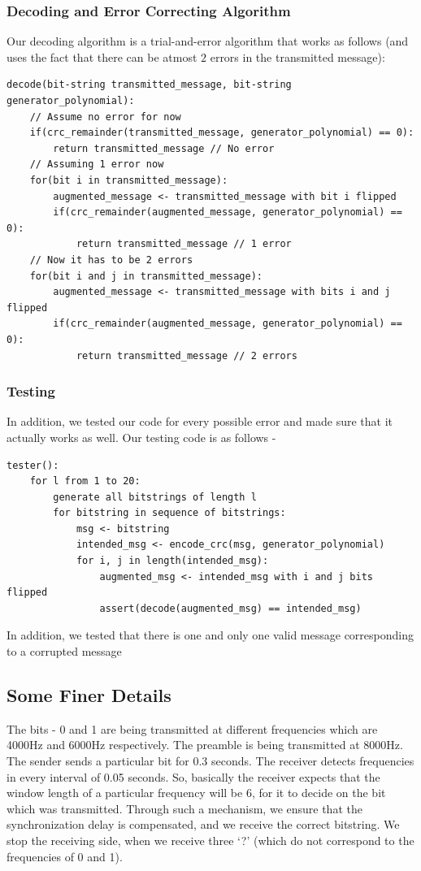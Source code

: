 \documentclass[a4paper,12pt]{article}
\begin{document}
\subsubsection{Decoding and Error Correcting Algorithm}
Our decoding algorithm is a trial-and-error algorithm that works as follows (and uses the fact that there can be atmost $2$ errors in the transmitted message):
\begin{verbatim}
decode(bit-string transmitted_message, bit-string generator_polynomial):
    // Assume no error for now
    if(crc_remainder(transmitted_message, generator_polynomial) == 0):
        return transmitted_message // No error
    // Assuming 1 error now
    for(bit i in transmitted_message):
        augmented_message <- transmitted_message with bit i flipped
        if(crc_remainder(augmented_message, generator_polynomial) == 0): 
            return transmitted_message // 1 error
    // Now it has to be 2 errors
    for(bit i and j in transmitted_message):
        augmented_message <- transmitted_message with bits i and j flipped
        if(crc_remainder(augmented_message, generator_polynomial) == 0): 
            return transmitted_message // 2 errors
\end{verbatim}
\subsubsection{Testing}
In addition, we tested our code for every possible error and made sure that it actually works as well. Our testing code is as follows - 
\begin{verbatim}
tester():
    for l from 1 to 20:
        generate all bitstrings of length l
        for bitstring in sequence of bitstrings:
            msg <- bitstring
            intended_msg <- encode_crc(msg, generator_polynomial)
            for i, j in length(intended_msg):
                augmented_msg <- intended_msg with i and j bits flipped
                assert(decode(augmented_msg) == intended_msg)
\end{verbatim}
In addition, we tested that there is one and only one valid message corresponding to a corrupted message

\subsection{Some Finer Details}
The bits - 0 and 1 are being transmitted at different frequencies which are 4000Hz and 6000Hz respectively. The preamble is being transmitted at 8000Hz. The sender sends a particular bit for 0.3 seconds. The receiver detects frequencies in every interval of 0.05 seconds. So, basically the receiver expects that the window length of a particular frequency will be 6, for it to decide on the bit which was transmitted. Through such a mechanism, we ensure that the synchronization delay is compensated, and we receive the correct bitstring. We stop the receiving side, when we receive three `?' (which do not correspond to the frequencies of 0 and 1).
\end{document}
